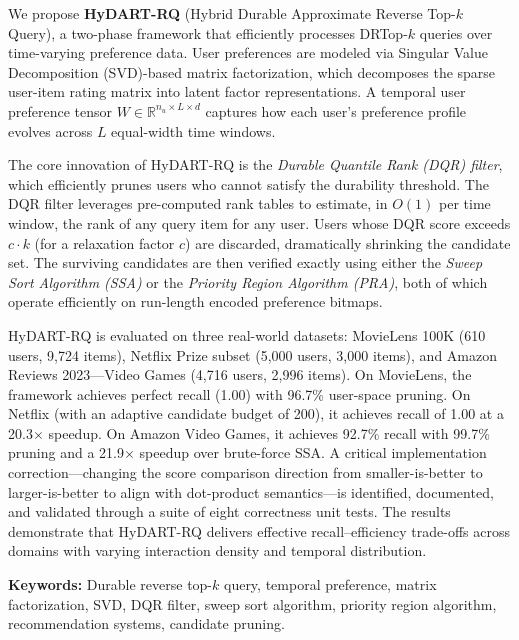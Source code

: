 \documentclass[
  12pt,
  english,
  oneside,
]{report}
\begin{document}
We propose \textbf{HyDART-RQ} (Hybrid Durable Approximate Reverse Top-$k$ Query), a two-phase framework that efficiently processes DRTop-$k$ queries over time-varying preference data. User preferences are modeled via Singular Value Decomposition (SVD)-based matrix factorization, which decomposes the sparse user-item rating matrix into latent factor representations. A temporal user preference tensor $W \in \mathbb{R}^{n_u \times L \times d}$ captures how each user's preference profile evolves across $L$ equal-width time windows.

The core innovation of HyDART-RQ is the \textit{Durable Quantile Rank (DQR) filter}, which efficiently prunes users who cannot satisfy the durability threshold. The DQR filter leverages pre-computed rank tables to estimate, in $O(1)$ per time window, the rank of any query item for any user. Users whose DQR score exceeds $c \cdot k$ (for a relaxation factor $c$) are discarded, dramatically shrinking the candidate set. The surviving candidates are then verified exactly using either the \textit{Sweep Sort Algorithm (SSA)} or the \textit{Priority Region Algorithm (PRA)}, both of which operate efficiently on run-length encoded preference bitmaps.

HyDART-RQ is evaluated on three real-world datasets: MovieLens 100K (610 users, 9{,}724 items), Netflix Prize subset (5{,}000 users, 3{,}000 items), and Amazon Reviews 2023---Video Games (4{,}716 users, 2{,}996 items). On MovieLens, the framework achieves perfect recall (1.00) with 96.7\% user-space pruning. On Netflix (with an adaptive candidate budget of 200), it achieves recall of 1.00 at a 20.3$\times$ speedup. On Amazon Video Games, it achieves 92.7\% recall with 99.7\% pruning and a 21.9$\times$ speedup over brute-force SSA. A critical implementation correction---changing the score comparison direction from smaller-is-better to larger-is-better to align with dot-product semantics---is identified, documented, and validated through a suite of eight correctness unit tests. The results demonstrate that HyDART-RQ delivers effective recall--efficiency trade-offs across domains with varying interaction density and temporal distribution.

\vspace{1em}
\noindent\textbf{Keywords:} Durable reverse top-$k$ query, temporal preference, matrix factorization, SVD, DQR filter, sweep sort algorithm, priority region algorithm, recommendation systems, candidate pruning.

\end{document}
